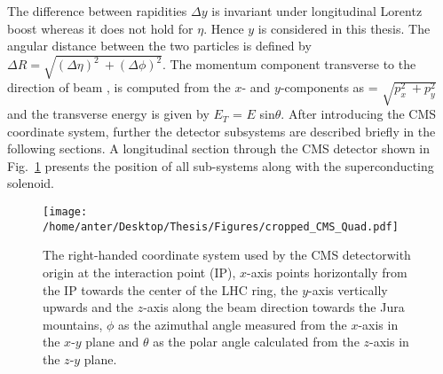 The difference between rapidities $\Delta y$ is invariant under longitudinal Lorentz boost whereas it does not hold for $\eta$. Hence $y$ is considered in this thesis. The angular distance between the two particles is defined by $\Delta R = \sqrt{(\Delta \eta)^2~\plus (\Delta \phi)^2}$. The momentum component transverse to the direction of beam \pt, is computed from the $x$- and $y$-components as \pt = $\sqrt{p^2_x~\plus p^2_y}$ and the transverse energy is given by $E_T$ = $E$ sin$\theta$. After introducing the CMS coordinate system, further the detector subsystems are described briefly in the following sections. A longitudinal section through the CMS detector shown in Fig.~\ref{fig:CMS_quad} presents the position of all sub-systems along with the superconducting solenoid.

\begin{figure}[!h]
\vspace*{2mm}
\begin{center} 
\hspace*{-5mm}
\texttt{[image: /home/anter/Desktop/Thesis/Figures/cropped\_CMS\_Quad.pdf]}
\vspace{3mm}
\caption[Quad]{The right-handed coordinate system used by the CMS detector\footnotemark with origin at the interaction point (IP), $x$-axis points horizontally from the IP towards the center of the LHC ring, the $y$-axis vertically upwards and the $z$-axis along the beam direction towards the Jura mountains, $\phi$ as the azimuthal angle measured from the $x$-axis in the $x$-$y$ plane and $\theta$ as the polar angle calculated from the $z$-axis in the $z$-$y$ plane.}
\label{fig:CMS_quad}
\end{center}
\end{figure}

